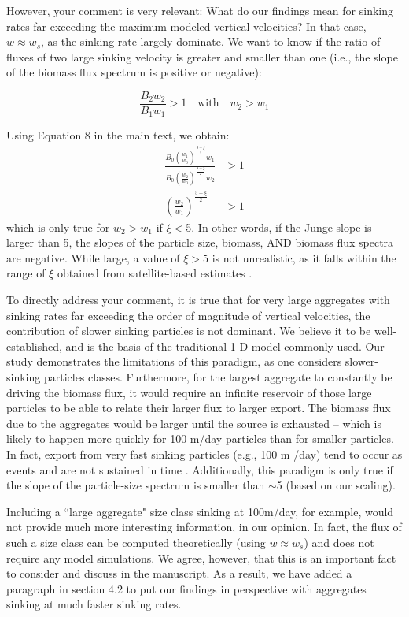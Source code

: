 \documentclass[12pt,letter]{article}
\begin{document}
{\color{blue}
	However, your comment is very relevant: What do our findings mean for sinking rates far exceeding the maximum modeled vertical velocities? In that case, $w \approx w_s$, as the sinking rate largely dominate. We want to know if the ratio of fluxes of two large sinking velocity is greater and smaller than one (i.e., the slope of the biomass flux spectrum is positive or negative):

\begin{equation}
	\frac{B_2w_2}{B_1w_1} >1 \quad \text{with} \quad w_2 > w_1
\end{equation}	

Using Equation 8 in the main text, we obtain:
\begin{align}
	\frac{B_0\left(\frac{w_1}{w_0}\right)^{\frac{3-\xi}{2}}w_1}{B_0\left(\frac{w_2}{w_0}\right)^{\frac{3-\xi}{2}}w_2} &> 1\\[.2cm]
	\left(\frac{w_2}{w_1}\right)^{\frac{5-\xi}{2}} &>1
\end{align}	
which is only true for $w_2 > w_1$ if $\xi<$5. In other words, if the Junge slope is larger than 5, the slopes of the particle size, biomass, AND biomass flux spectra are negative. While large, a value of $\xi>5$ is not unrealistic, as it falls within the range of $\xi$ obtained from satellite-based estimates \citep{Kostadinov_2009}.

To directly address your comment, it is true that for very large aggregates with sinking rates far exceeding the order of magnitude of vertical velocities, the contribution of slower sinking particles is not dominant. We believe it to be well-established, and is the basis of the traditional 1-D model commonly used. Our study demonstrates the limitations of this paradigm, as one considers slower-sinking particles classes. Furthermore, for the largest aggregate to constantly be driving the biomass flux, it would require an infinite reservoir of those large particles to be able to relate their larger flux to larger export. The biomass flux due to the aggregates would be larger until the source is exhausted -- which is likely to happen more quickly for 100 m/day particles than for smaller particles. In fact, export from very fast sinking particles (e.g., 100 m /day) tend to occur as events and are not sustained in time \citep{Kiko_2017}.
Additionally, this paradigm is only true if the slope of the particle-size spectrum is smaller than $\sim$5 (based on our scaling).

Including a ``large aggregate" size class sinking at 100m/day, for example, would not provide much more interesting information, in our opinion. In fact, the flux of such a size class can be computed theoretically (using $w \approx w_s$) and does not require any model simulations. We agree, however, that this is an important fact to consider and discuss in the manuscript. As a result, we have added a paragraph in section 4.2 to put our findings in perspective with aggregates sinking at much faster sinking rates.}
	
\end{document}
